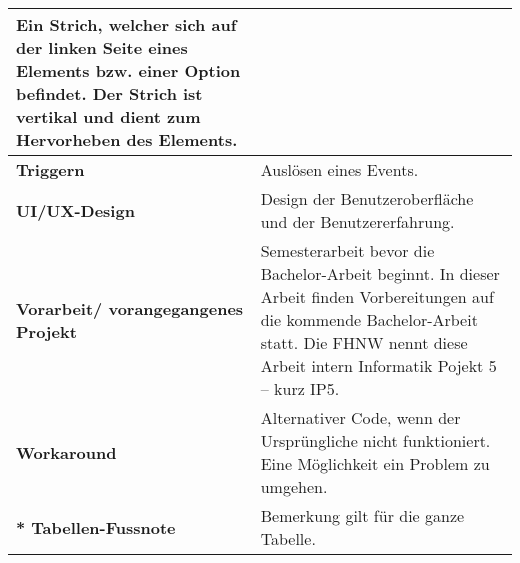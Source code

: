\begin{table}[!ht]
\begin{adjustbox}{max width=\textwidth}
\begin{threeparttable}
\begin{tabular}{ p{\glossarywithTitle} | p{\glossarywith} }
                    Ein Strich, welcher sich auf der linken Seite eines Elements bzw. einer Option befindet. 
                    Der Strich ist vertikal und dient zum Hervorheben des Elements. \\
                \hline
                \bf{Triggern} & Auslösen eines Events. \\
                \hline
                \bf{UI/UX-Design} & Design der Benutzeroberfläche und der Benutzererfahrung. \\
                \hline
                \raggedright \bf{Vorarbeit/ vorangegangenes Projekt} & 
                    Semesterarbeit bevor die Bachelor-Arbeit beginnt. 
                    In dieser Arbeit finden Vorbereitungen auf die kommende Bachelor-Arbeit statt. 
                    Die FHNW nennt diese Arbeit intern Informatik Pojekt 5 – kurz IP5. \\
                \hline
                \bf{Workaround} & 
                    Alternativer Code, wenn der Ursprüngliche nicht funktioniert. 
                    Eine Möglichkeit ein Problem zu umgehen. \\
                \hline
                \hline
                \raggedright \bf{* Tabellen-Fussnote} & Bemerkung gilt für die ganze Tabelle. \\
                \hline
            \end{tabular}
        \end{threeparttable}
    \end{adjustbox}
\end{table}

